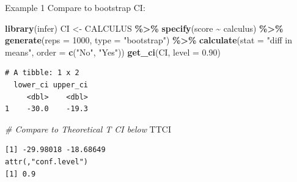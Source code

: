 \documentclass[
  ignorenonframetext,
]{beamer}
\newenvironment{Shaded}{\begin{snugshade}}{\end{snugshade}}
\newcommand{\AttributeTok}[1]{\textcolor[rgb]{0.13,0.29,0.53}{#1}}
\newcommand{\CommentTok}[1]{\textcolor[rgb]{0.56,0.35,0.01}{\textit{#1}}}
\newcommand{\DecValTok}[1]{\textcolor[rgb]{0.00,0.00,0.81}{#1}}
\newcommand{\FloatTok}[1]{\textcolor[rgb]{0.00,0.00,0.81}{#1}}
\newcommand{\FunctionTok}[1]{\textcolor[rgb]{0.13,0.29,0.53}{\textbf{#1}}}
\newcommand{\NormalTok}[1]{#1}
\newcommand{\OtherTok}[1]{\textcolor[rgb]{0.56,0.35,0.01}{#1}}
\newcommand{\SpecialCharTok}[1]{\textcolor[rgb]{0.81,0.36,0.00}{\textbf{#1}}}
\newcommand{\StringTok}[1]{\textcolor[rgb]{0.31,0.60,0.02}{#1}}
\begin{document}
\begin{frame}[fragile]{Example 1}
\protect\hypertarget{example-1-4}{}
Compare to bootstrap CI: \tiny

\begin{Shaded}
\begin{Highlighting}[]
\FunctionTok{library}\NormalTok{(infer)}
\NormalTok{CI }\OtherTok{\textless{}{-}}\NormalTok{ CALCULUS }\SpecialCharTok{\%\textgreater{}\%} 
  \FunctionTok{specify}\NormalTok{(score }\SpecialCharTok{\textasciitilde{}}\NormalTok{ calculus) }\SpecialCharTok{\%\textgreater{}\%} 
  \FunctionTok{generate}\NormalTok{(}\AttributeTok{reps =} \DecValTok{1000}\NormalTok{, }\AttributeTok{type =} \StringTok{"bootstrap"}\NormalTok{) }\SpecialCharTok{\%\textgreater{}\%} 
  \FunctionTok{calculate}\NormalTok{(}\AttributeTok{stat =} \StringTok{"diff in means"}\NormalTok{, }\AttributeTok{order =} \FunctionTok{c}\NormalTok{(}\StringTok{"No"}\NormalTok{, }\StringTok{"Yes"}\NormalTok{))}
\FunctionTok{get\_ci}\NormalTok{(CI, }\AttributeTok{level =} \FloatTok{0.90}\NormalTok{)}
\end{Highlighting}
\end{Shaded}

\begin{verbatim}
# A tibble: 1 x 2
  lower_ci upper_ci
     <dbl>    <dbl>
1    -30.0    -19.3
\end{verbatim}

\begin{Shaded}
\begin{Highlighting}[]
\CommentTok{\# Compare to Theoretical T CI below}
\NormalTok{TTCI}
\end{Highlighting}
\end{Shaded}

\begin{verbatim}
[1] -29.98018 -18.68649
attr(,"conf.level")
[1] 0.9
\end{verbatim}

\normalsize
\end{frame}
\end{document}
